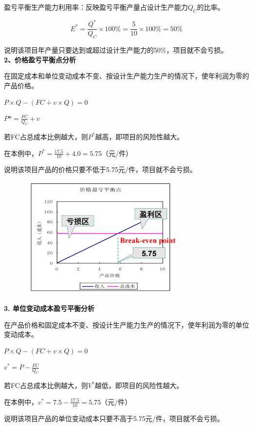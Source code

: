 盈亏平衡生产能力利用率：反映盈亏平衡产量占设计生产能力$Q_C$的比率。

$$E^*=\frac{Q^*}{Q_C} \times 100\% =\frac{5}{10} \times 100\% = 50\%$$

说明该项目年产量只要达到或超过设计生产能力的50\%，项目就不会亏损。\\\textbf{2、价格盈亏平衡点分析}

在固定成本和单位变动成本不变、按设计生产能力生产的情况下，使年利润为零的产品价格。

$P \times Q - (FC+v \times Q)=0$

$P* = \frac{FC}{Q_C}+v$

若FC占总成本比例越大，则$P^*$越高，即项目的风险性越大。

在本例中，$P^* = \frac{17.5}{10}+ 4.0 = 5.75$（元/件）

说明该项目产品的价格只要不低于5.75元/件，项目就不会亏损。

\begin{figure}[H]
    \centering
    \includegraphics[width=0.75\textwidth]{image/静态盈亏平衡分析.png}
    \label{fig:21}
\end{figure}

\noindent \textbf{3. 单位变动成本盈亏平衡分析}

在产品价格和固定成本不变、按设计生产能力生产的情况下，使年利润为零的单位变动成本。

$P×Q-(FC+v×Q)=0$

$v^*=P-\frac{FC}{Q_C}$

若FC占总成本比例越大，则$V^*$越低，即项目的风险性越大。

在本例中，$v^*=7.5-\frac{17.5}{10}=5.75$（元/件）

说明该项目产品的单位变动成本只要不高于5.75元/件，项目就不会亏损。

